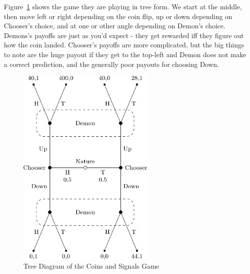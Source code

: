 \documentclass[
  12pt,
  letterpaper,
  DIV=11,
  numbers=noendperiod]{scrreprt}
\begin{document}
Figure~\ref{fig-second-anti-war} shows the game they are playing in tree
form. We start at the middle, then move left or right depending on the
coin flip, up or down depending on Chooser's choice, and at one or other
angle depending on Demon's choice. Demons's payoffs are just as you'd
expect - they get rewarded iff they figure out how the coin landed.
Chooser's payoffs are more complicated, but the big things to note are
the huge payout if they get to the top-left and Demon does not make a
correct prediction, and the generally poor payouts for choosing Down.

\begin{figure}

{\centering \includegraphics[width=0.6\textwidth,height=\textheight]{war-signal_files/figure-pdf/fig-second-anti-war-1.png}

}

\caption{\label{fig-second-anti-war}Tree Diagram of the Coins and
Signals Game}

\end{figure}
\end{document}
